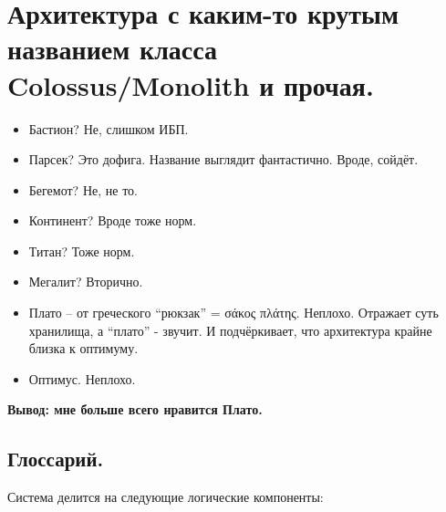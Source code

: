 \section{Архитектура с каким-то крутым названием класса
Colossus/Monolith и
прочая.}\label{ux430ux440ux445ux438ux442ux435ux43aux442ux443ux440ux430-ux441-ux43aux430ux43aux438ux43c-ux442ux43e-ux43aux440ux443ux442ux44bux43c-ux43dux430ux437ux432ux430ux43dux438ux435ux43c-ux43aux43bux430ux441ux441ux430-colossusmonolith-ux438-ux43fux440ux43eux447ux430ux44f.}

\begin{itemize}
\tightlist
\item
  Бастион? Не, слишком ИБП.
\item
  Парсек? Это дофига. Название выглядит фантастично. Вроде, сойдёт.
\item
  Бегемот? Не, не то.
\item
  Континент? Вроде тоже норм.
\item
  Титан? Тоже норм.
\item
  Мегалит? Вторично.
\item
  Плато -- от греческого ``рюкзак'' = σάκος πλάτης. Неплохо. Отражает
  суть хранилища, а ``плато'' - звучит. И подчёркивает, что архитектура
  крайне близка к оптимуму.
\item
  Оптимус. Неплохо.
\end{itemize}

\textbf{Вывод: мне больше всего нравится Плато.}

\subsection{Глоссарий.}\label{ux433ux43bux43eux441ux441ux430ux440ux438ux439.}

Система делится на следующие логические компоненты:

